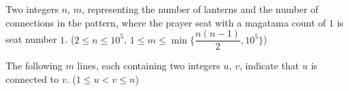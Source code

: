 Two integers $n$, $m$, representing the number of lanterns and the number of connections in the pattern, where the prayer seat with a magatama count of $1$ is seat number $1$. ($2 \le n \le 10^5$, $1 \le m \le \min {\{\dfrac{n(n - 1)}{2}, 10^5\}}$)

The following $m$ lines, each containing two integers $u$, $v$, indicate that $u$ is connected to $v$. ($1 \le u < v \le n$)